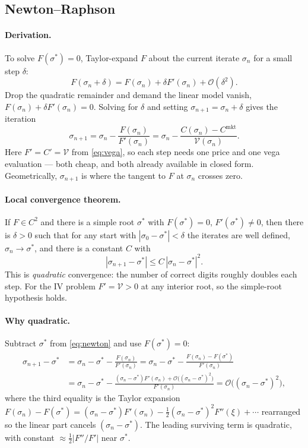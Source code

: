 \documentclass[11pt]{article}
\newcommand{\mkt}{\mathrm{mkt}}
\newcommand{\Vega}{\mathcal{V}}
\begin{document}
\subsection{Newton--Raphson}

\paragraph{Derivation.} To solve $F(\sigma^*)=0$, Taylor-expand $F$ about the current iterate
$\sigma_n$ for a small step $\delta$:
\[
F(\sigma_n+\delta)=F(\sigma_n)+\delta F'(\sigma_n)+\mathcal O(\delta^2).
\]
Drop the quadratic remainder and demand the linear model vanish, $F(\sigma_n)+\delta F'(\sigma_n)=0$.
Solving for $\delta$ and setting $\sigma_{n+1}=\sigma_n+\delta$ gives the iteration
\begin{equation}\label{eq:newton}
\sigma_{n+1}=\sigma_n-\frac{F(\sigma_n)}{F'(\sigma_n)}
=\sigma_n-\frac{C(\sigma_n)-C^{\mkt}}{\Vega(\sigma_n)}.
\end{equation}
Here $F'=C'=\Vega$ from \eqref{eq:vega}, so each step needs one price and one vega evaluation ---
both cheap, and both already available in closed form. Geometrically, $\sigma_{n+1}$ is where the
tangent to $F$ at $\sigma_n$ crosses zero.

\paragraph{Local convergence theorem.} If $F\in C^2$ and there is a simple root $\sigma^*$ with
$F(\sigma^*)=0$, $F'(\sigma^*)\neq0$, then there is $\delta>0$ such that for any start with
$|\sigma_0-\sigma^*|<\delta$ the iterates are well defined, $\sigma_n\to\sigma^*$, and there is a
constant $C$ with
\begin{equation}\label{eq:quad}
|\sigma_{n+1}-\sigma^*|\le C\,|\sigma_n-\sigma^*|^2.
\end{equation}
This is \emph{quadratic} convergence: the number of correct digits roughly doubles each step. For
the IV problem $F'=\Vega>0$ at any interior root, so the simple-root hypothesis holds.

\paragraph{Why quadratic.} Subtract $\sigma^*$ from \eqref{eq:newton} and use $F(\sigma^*)=0$:
\begin{align*}
\sigma_{n+1}-\sigma^*
&=\sigma_n-\sigma^*-\frac{F(\sigma_n)}{F'(\sigma_n)}
=\sigma_n-\sigma^*-\frac{F(\sigma_n)-F(\sigma^*)}{F'(\sigma_n)}\\
&=\sigma_n-\sigma^*-\frac{(\sigma_n-\sigma^*)F'(\sigma_n)+\mathcal O\big((\sigma_n-\sigma^*)^2\big)}
{F'(\sigma_n)}
=\mathcal O\big((\sigma_n-\sigma^*)^2\big),
\end{align*}
where the third equality is the Taylor expansion
$F(\sigma_n)-F(\sigma^*)=(\sigma_n-\sigma^*)F'(\sigma_n)-\tfrac12(\sigma_n-\sigma^*)^2F''(\xi)+\cdots$
rearranged so the linear part cancels $(\sigma_n-\sigma^*)$. The leading surviving term is
quadratic, with constant $\approx \tfrac12|F''/F'|$ near $\sigma^*$.
\end{document}
